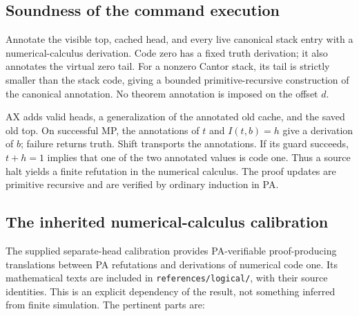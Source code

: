 \documentclass[11pt,letterpaper]{article}
\newcommand{\file}[1]{\nolinkurl{#1}}
\begin{document}
\subsection{Soundness of the command execution}

Annotate the visible top, cached head, and every live canonical stack
entry with a numerical-calculus derivation. Code zero has a fixed truth
derivation; it also annotates the virtual zero tail. For a nonzero Cantor
stack, its tail is strictly smaller than the stack code, giving a bounded
primitive-recursive construction of the canonical annotation. No theorem
annotation is imposed on the offset $d$.

AX adds valid heads, a generalization of the annotated old cache, and the
saved old top. On successful MP, the annotations of $t$ and $I(t,b)=h$
give a derivation of $b$; failure returns truth. Shift transports the
annotations. If its guard succeeds, $t+h=1$ implies that one of the two
annotated values is code one. Thus a source halt yields a finite refutation
in the numerical calculus. The proof updates are primitive recursive and
are verified by ordinary induction in PA.

\subsection{The inherited numerical-calculus calibration}

The supplied separate-head calibration\cite{cal} provides PA-verifiable proof-producing
translations between PA refutations and derivations of numerical code one.
Its mathematical texts are included in \file{references/logical/}, with
their source identities. This is an explicit dependency of the result,
not something inferred from finite simulation. The pertinent parts are:
\end{document}
